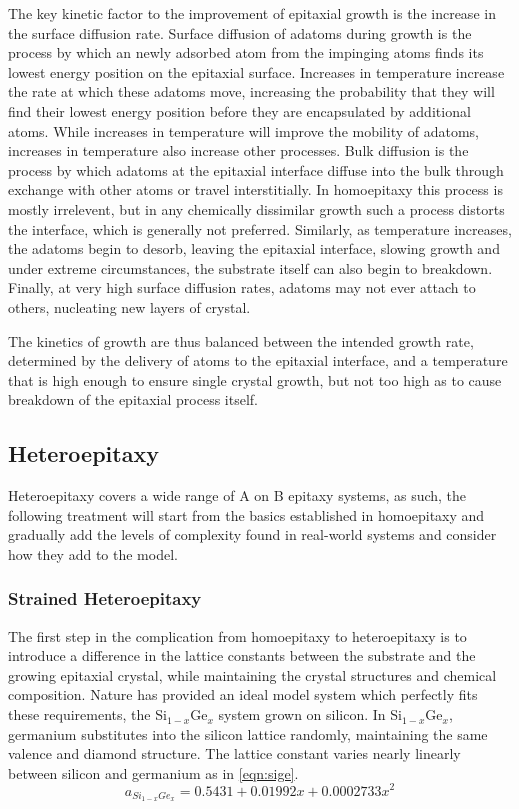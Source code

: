 The key kinetic factor to the improvement of epitaxial growth is the increase in the surface diffusion rate. Surface diffusion of adatoms during growth is the process by which an newly adsorbed atom from the impinging atoms finds its lowest energy position on the epitaxial surface. Increases in temperature increase the rate at which these adatoms move, increasing the probability that they will find their lowest energy position before they are encapsulated by additional atoms. While increases in temperature will improve the mobility of adatoms, increases in temperature also increase other processes. Bulk diffusion is the process by which adatoms at the epitaxial interface diffuse into the bulk through exchange with other atoms or travel interstitially. In homoepitaxy this process is mostly irrelevent, but in any chemically dissimilar growth such a process distorts the interface, which is generally not preferred. Similarly, as temperature increases, the adatoms begin to desorb, leaving the epitaxial interface, slowing growth and under extreme circumstances, the substrate itself can also begin to breakdown. Finally, at very high surface diffusion rates, adatoms may not ever attach to others, nucleating new layers of crystal.

The kinetics of growth are thus balanced between the intended growth rate, determined by the delivery of atoms to the epitaxial interface, and a temperature that is high enough to ensure single crystal growth, but not too high as to cause breakdown of the epitaxial process itself.



\subsection{Heteroepitaxy}
Heteroepitaxy covers a wide range of A on B epitaxy systems, as such, the following treatment will start from the basics established in homoepitaxy and gradually add the levels of complexity found in real-world systems and consider how they add to the model.

\subsubsection{Strained Heteroepitaxy}
The first step in the complication from homoepitaxy to heteroepitaxy is to introduce a difference in the lattice constants between the substrate and the growing epitaxial crystal, while maintaining the crystal structures and chemical composition. Nature has provided an ideal model system which perfectly fits these requirements, the Si$_{1-x}$Ge$_x$ system grown on silicon. In Si$_{1-x}$Ge$_x$, germanium substitutes into the silicon lattice randomly, maintaining the same valence and diamond structure. The lattice constant varies nearly linearly between silicon and germanium as in \cref{eqn:sige}.
\begin{equation}
a_{Si_{1-x}Ge_x} = 0.5431 + 0.01992x + 0.0002733x^2 \label{eqn:sige}
\end{equation}


